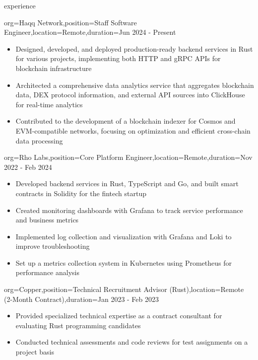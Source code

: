 \documentclass{resume}
\begin{document}
\begin{ResumeSection}{experience}
\begin{ResumeSubsection}{org=Haqq Network,position=Staff Software Engineer,location=Remote,duration=Jun 2024 - Present}
        \begin{itemize}
            \item Designed, developed, and deployed production-ready backend services in Rust for various projects, implementing both HTTP and gRPC APIs for blockchain infrastructure
            \item Architected a comprehensive data analytics service that aggregates blockchain data, DEX protocol information, and external API sources into ClickHouse for real-time analytics
            \item Contributed to the development of a blockchain indexer for Cosmos and EVM-compatible networks, focusing on optimization and efficient cross-chain data processing
        \end{itemize}
    \end{ResumeSubsection}

    \begin{ResumeSubsection}{org=Rho Labs,position=Core Platform Engineer,location=Remote,duration=Nov 2022 - Feb 2024}
    \begin{itemize}
        \item Developed backend services in Rust, TypeScript and Go, and built smart contracts in Solidity for the fintech startup
        \item Created monitoring dashboards with Grafana to track service performance and business metrics
        \item Implemented log collection and visualization with Grafana and Loki to improve troubleshooting
        \item Set up a metrics collection system in Kubernetes using Prometheus for performance analysis
    \end{itemize}
\end{ResumeSubsection}

    \begin{ResumeSubsection}{org=Copper,position=Technical Recruitment Advisor (Rust),location=Remote (2-Month Contract),duration=Jan 2023 - Feb 2023}
        \begin{itemize}
            \item Provided specialized technical expertise as a contract consultant for evaluating Rust programming candidates
            \item Conducted technical assessments and code reviews for test assignments on a project basis
        \end{itemize}
    \end{ResumeSubsection}


\end{ResumeSection}
\end{document}
